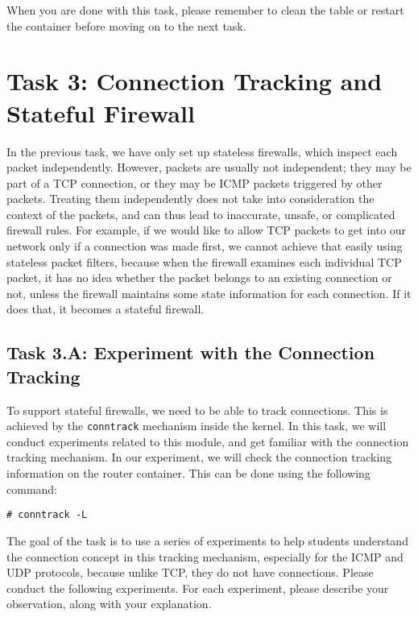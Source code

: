 When you are done with this task,
please remember to clean the table or restart the container 
before moving on to the next task.




\section{Task 3: Connection Tracking and Stateful Firewall}


In the previous task, we have only set up stateless firewalls, which inspect each
packet independently. However, packets
are usually not independent; they may be part of a TCP connection,
or they may be ICMP packets triggered by other packets. Treating them
independently does not take into consideration the context of the
packets, and can thus lead to inaccurate, unsafe, or complicated firewall rules.
For example, if we would like to allow TCP packets to get into our network
only if a connection was made first, we cannot achieve that easily 
using stateless packet filters, because when the firewall examines each individual TCP packet,
it has no idea whether the packet belongs to an existing connection
or not, unless the firewall maintains some state information for each connection.
If it does that, it becomes a stateful firewall.


\subsection{Task 3.A: Experiment with the Connection Tracking} 


To support stateful firewalls, we need to be able to track connections. 
This is achieved by the \texttt{conntrack} mechanism inside the kernel. 
In this task, we will conduct experiments related to this module, and 
get familiar with the connection tracking mechanism. 
In our experiment, we will check the connection tracking information
on the router container. This can be done using the following command: 

\begin{lstlisting}
# conntrack -L
\end{lstlisting}

The goal of the task is to use a series of experiments to 
help students understand the 
connection concept in this tracking mechanism, especially
for the ICMP and UDP protocols, because unlike TCP,  they 
do not have connections. 
Please conduct the following experiments. For each experiment, please 
describe your observation, along with your explanation. 

